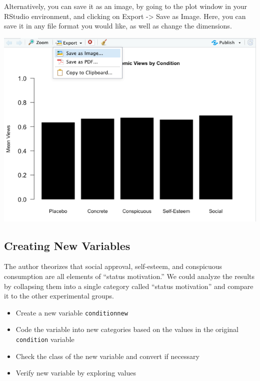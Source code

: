 \documentclass[
  letterpaper,
  DIV=11,
  numbers=noendperiod]{scrreprt}
\providecommand{\tightlist}{%
  \setlength{\itemsep}{0pt}\setlength{\parskip}{0pt}}\usepackage{longtable,booktabs,array}
\begin{document}
Alternatively, you can save it as an image, by going to the plot window
in your RStudio environment, and clicking on Export -\textgreater{} Save
as Image. Here, you can save it in any file format you would like, as
well as change the dimensions.

\includegraphics{images/saveplot.png}

\hypertarget{creating-new-variables}{%
\subsection{Creating New Variables}\label{creating-new-variables}}

The author theorizes that social approval, self-esteem, and conspicuous
consumption are all elements of ``status motivation.'' We could analyze
the results by collapsing them into a single category called ``status
motivation'' and compare it to the other experimental groups.

\begin{itemize}
\tightlist
\item
  Create a new variable \texttt{conditionnew}
\item
  Code the variable into new categories based on the values in the
  original \texttt{condition} variable
\item
  Check the class of the new variable and convert if necessary
\item
  Verify new variable by exploring values
\end{itemize}
\end{document}
